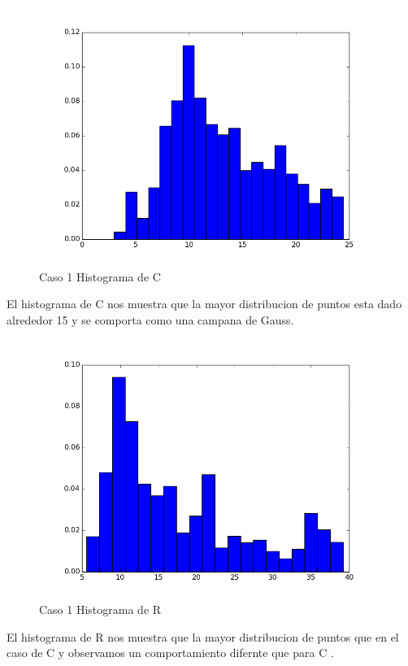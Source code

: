 \documentclass{article}
\begin{document}
\newpage
\begin{figure}[h!]
  \includegraphics[scale=0.5]{histogramaC.png}
  \caption{Caso 1 Histograma de C }
\end{figure}
El histograma de C nos muestra que la mayor distribucion de puntos esta dado alrededor 15 y se comporta como una campana de Gauss. \\

\newpage
\begin{figure}[h!]
  \includegraphics[scale=0.5]{histogramaR.png}
  \caption{Caso 1 Histograma de R }
\end{figure}
El histograma de R nos muestra que la mayor distribucion de puntos que en el caso de C y observamos un comportamiento difernte que para C . \\





\end{document}
